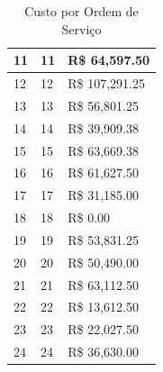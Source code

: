 \begin{table}[H]
\begin{tabular}{|l|l|l|}
11                                                               & 11          & R\$                    64,597.50      \\ \hline
12                                                               & 12          & R\$                  107,291.25       \\ \hline
13                                                               & 13          & R\$                    56,801.25      \\ \hline
14                                                               & 14          & R\$                    39,909.38      \\ \hline
15                                                               & 15          & R\$                    63,669.38      \\ \hline
16                                                               & 16          & R\$                    61,627.50      \\ \hline
17                                                               & 17          & R\$                    31,185.00      \\ \hline
18                                                               & 18          & R\$                                 0.00 \\ \hline
19                                                               & 19          & R\$                    53,831.25      \\ \hline
20                                                               & 20          & R\$                    50,490.00      \\ \hline
21                                                               & 21          & R\$                    63,112.50      \\ \hline
22                                                               & 22          & R\$                    13,612.50      \\ \hline
23                                                               & 23          & R\$                    22,027.50      \\ \hline
24                                                               & 24          & R\$                    36,630.00      \\ \hline
\end{tabular}
\caption{Custo por Ordem de Serviço}
		\label{custo}
\end{table}



